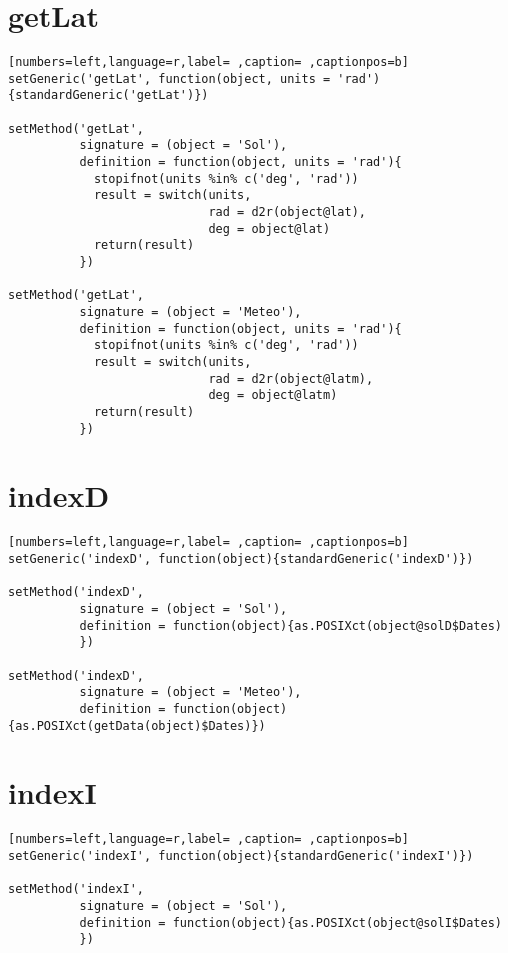 \section{getLat}
\label{sec:org78b8cce}
\begin{lstlisting}[numbers=left,language=r,label= ,caption= ,captionpos=b]
setGeneric('getLat', function(object, units = 'rad')
{standardGeneric('getLat')})

setMethod('getLat',
          signature = (object = 'Sol'),
          definition = function(object, units = 'rad'){
            stopifnot(units %in% c('deg', 'rad'))
            result = switch(units,
                            rad = d2r(object@lat),
                            deg = object@lat)
            return(result)
          })

setMethod('getLat',
          signature = (object = 'Meteo'),
          definition = function(object, units = 'rad'){
            stopifnot(units %in% c('deg', 'rad'))
            result = switch(units,
                            rad = d2r(object@latm),
                            deg = object@latm)
            return(result)
          })
\end{lstlisting}
\section{indexD}
\label{sec:orgcecf12a}
\begin{lstlisting}[numbers=left,language=r,label= ,caption= ,captionpos=b]
setGeneric('indexD', function(object){standardGeneric('indexD')})

setMethod('indexD',
          signature = (object = 'Sol'),
          definition = function(object){as.POSIXct(object@solD$Dates)
          })

setMethod('indexD',
          signature = (object = 'Meteo'),
          definition = function(object){as.POSIXct(getData(object)$Dates)})
\end{lstlisting}
\section{indexI}
\label{sec:orge767383}
\begin{lstlisting}[numbers=left,language=r,label= ,caption= ,captionpos=b]
setGeneric('indexI', function(object){standardGeneric('indexI')})

setMethod('indexI',
          signature = (object = 'Sol'),
          definition = function(object){as.POSIXct(object@solI$Dates)
          })
\end{lstlisting}
